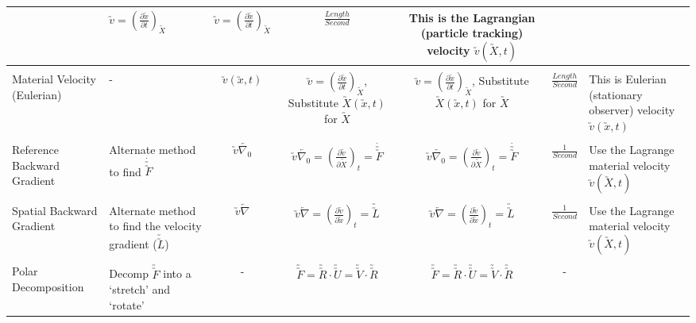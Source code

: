 \documentclass[10pt]{article}
\begin{document}
\begin{center}
\begin{tabular}{l m{3in} c c c c m{5in}}
&%
$ \utilde{v} =(\frac{\partial \utilde{x}}{\partial t})_{\utilde{X}} $
&%
$ \utilde{v} =(\frac{\partial \utilde{x}}{\partial t})_{\utilde{X}} $
&%
$ \frac{Length}{Second} $
&%
This is the Lagrangian (particle tracking) velocity $\utilde{v}(\utilde{X},t)$
\\[1ex]
\hline
\\[-1ex]
Material Velocity (Eulerian)
&%
-
&%
$ \utilde{v}(\utilde{x},t) $
&%
$ \utilde{v} =(\frac{\partial \utilde{x}}{\partial t})_{\utilde{X}}$, Substitute $\utilde{X}(\utilde{x},t)$ for $\utilde{X}$
&%
$ \utilde{v} =(\frac{\partial \utilde{x}}{\partial t})_{\utilde{X}}$, Substitute $\utilde{X}(\utilde{x},t)$ for $\utilde{X}$
&%
$ \frac{Length}{Second} $
&%
This is Eulerian (stationary observer) velocity $\utilde{v}(\utilde{x},t)$
\\[1ex]
\hline
\\[-1ex]
Reference Backward Gradient
&%
Alternate method to find $\dot{\utilde{\utilde{F}}}$
&%
$ \utilde{v}\overleftarrow{\nabla_{0}} $
&%
$ \utilde{v}\overleftarrow{\nabla_{0}} = (\frac{\partial \utilde{v}}{\partial \utilde{X}})_{t}=\dot{\utilde{\utilde{F}}} $
&%
$ \utilde{v}\overleftarrow{\nabla_{0}} = (\frac{\partial \utilde{v}}{\partial \utilde{X}})_{t}=\dot{\utilde{\utilde{F}}} $
&%
$ \frac{1}{Second} $
%
&%
Use the Lagrange material velocity $\utilde{v}(\utilde{X},t)$
\\[1ex]
\hline
\\[-1ex]
Spatial Backward Gradient
&%
Alternate method to find the velocity gradient ($\utilde{\utilde{L}}$)
&%
$ \utilde{v}\overleftarrow{\nabla} $
&%
$ \utilde{v}\overleftarrow{\nabla} =(\frac{\partial \utilde{v}}{\partial \utilde{x}})_{t}=\utilde{\utilde{L}} $
&%
$ \utilde{v}\overleftarrow{\nabla} =(\frac{\partial \utilde{v}}{\partial \utilde{x}})_{t}=\utilde{\utilde{L}} $
&%
$ \frac{1}{Second} $
&%
Use the Lagrange material velocity $\utilde{v}(\utilde{X},t)$
\\[1ex]
\hline
\\[-1ex]
Polar Decomposition
&%
Decomp $\utilde{\utilde{F}}$ into a `stretch' and `rotate'
&%
-
&%
$ \utilde{\utilde{F}}=\utilde{\utilde{R}}\cdot\utilde{\utilde{U}}=\utilde{\utilde{V}}\cdot\utilde{\utilde{R}} $
&%
$ \utilde{\utilde{F}}=\utilde{\utilde{R}}\cdot\utilde{\utilde{U}}=\utilde{\utilde{V}}\cdot\utilde{\utilde{R}} $
&%
-
&%
 

\end{tabular}
\end{center}
\end{document}
